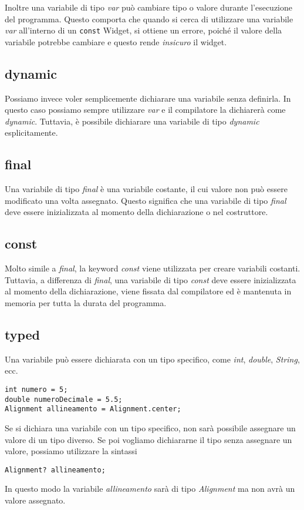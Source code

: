 \documentclass[12pt]{article}
\begin{document}
Inoltre una variabile di tipo \textit{var} può cambiare tipo o valore 
durante l'esecuzione del programma. 
Questo comporta che quando si cerca di utilizzare una variabile 
\textit{var} all'interno di un \texttt{const} Widget, si ottiene 
un errore, poiché il valore della variabile potrebbe cambiare e 
questo rende \textit{insicuro} il widget.

\subsection{dynamic}
Possiamo invece voler semplicemente dichiarare una variabile 
senza definirla. In questo caso possiamo sempre utilizzare \textit{var}
e il compilatore la dichiarerà come \textit{dynamic}.
Tuttavia, è possibile dichiarare una variabile di tipo \textit{dynamic}
esplicitamente.

\subsection{final}
Una variabile di tipo \textit{final} è una variabile costante,
il cui valore non può essere modificato una volta assegnato.
Questo significa che una variabile di tipo \textit{final} deve essere
inizializzata al momento della dichiarazione o nel costruttore.

\subsection{const}
Molto simile a \textit{final}, la keyword \textit{const} viene utilizzata
per creare variabili costanti. Tuttavia, a differenza di \textit{final},
una variabile di tipo \textit{const} deve essere inizializzata al momento
della dichiarazione, viene fissata dal compilatore ed 
è mantenuta in memoria per tutta la durata del programma.


\subsection{typed}
Una variabile può essere dichiarata con un tipo specifico,
come \textit{int}, \textit{double}, \textit{String}, ecc.
\begin{highlight}
\begin{verbatim}
int numero = 5;
double numeroDecimale = 5.5;
Alignment allineamento = Alignment.center;
\end{verbatim}
\end{highlight}
Se si dichiara una variabile con un tipo specifico, non sarà possibile
assegnare un valore di un tipo diverso. Se poi vogliamo dichiararne
il tipo senza assegnare un valore, possiamo utilizzare la sintassi
\begin{highlight}
\begin{verbatim}
Alignment? allineamento;
\end{verbatim}
\end{highlight}
In questo modo la variabile \textit{allineamento} sarà di tipo \textit{Alignment}
ma non avrà un valore assegnato.
\end{document}
